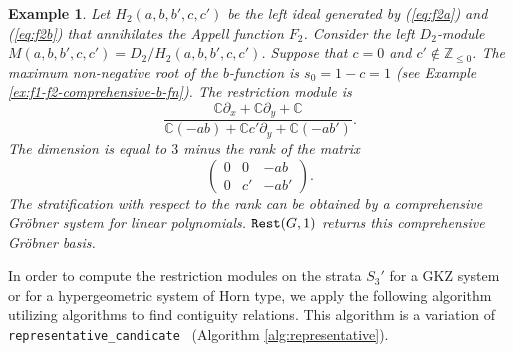 \documentclass{article}
\def\CC{\mathbb{C}}
\def\ZZ{\mathbb{Z}}
\def\pd#1{\partial_{#1}}
\def\aalpha{a}
\def\bbeta{b}
\def\ggamma{c}
\newtheorem{example}{Example}
\begin{document}
\begin{example} \rm
Let $H_2(a,b,b',c,c')$ be the left ideal
generated by (\ref{eq:f2a}) and (\ref{eq:f2b})
that annihilates the Appell function $F_2$.
Consider the left $D_2$-module $M(a,b,b',c,c')=D_2/H_2(a,b,b',c,c')$.
Suppose that $c=0$ and $c' \notin \ZZ_{\leq 0}$.
The maximum non-negative root of the $b$-function is $s_0=1-c=1$
(see Example \ref{ex:f1-f2-comprehensive-b-fn}).
The restriction module is
$$
\frac{\CC\pd{x}+\CC\pd{y}+\CC}
 {
   \CC (-a b) + \CC c' \pd{y} + \CC (-a b')
 }.
$$
The dimension is equal to $3$ minus the rank of the matrix
$$
\begin{pmatrix}
0 & 0 & -\aalpha \bbeta \\
0 & \ggamma' & -\aalpha \bbeta' 
\end{pmatrix}.
$$
The stratification with respect to the rank can be obtained
by a comprehensive Gr\"obner system for linear polynomials.
$\mbox{\tt Rest}(G,1)$ returns this comprehensive Gr\"obner basis.
\end{example}


In order to compute the restriction modules on the strata $S_3'$
for a GKZ system or for a hypergeometric system of Horn type, 
we apply the following algorithm utilizing algorithms to find contiguity relations.
This algorithm is a variation of {\tt representative\_candicate} \ 
(Algorithm \ref{alg:representative}).
\end{document}
